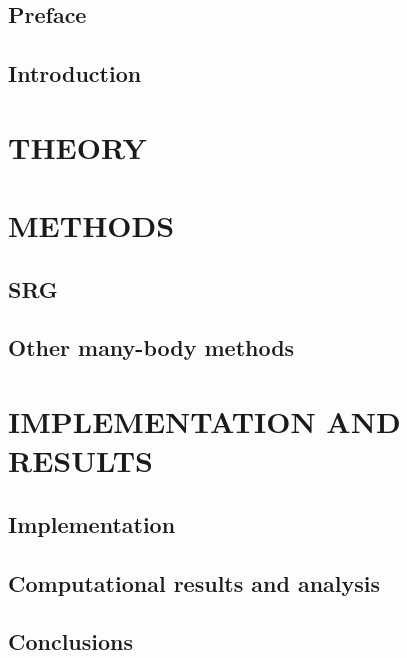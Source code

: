 \documentclass[11pt,a4wide,twoside,openright]{report}
\begin{document}


\chapter*{Preface}

\tableofcontents
\chapter{Introduction}
\part{THEORY}







\part{METHODS}
\chapter{SRG}






\chapter{Other many-body methods}



\part{IMPLEMENTATION AND RESULTS}
\chapter{Implementation}








\chapter{Computational results and analysis}



\chapter{Conclusions}



%


\end{document}
